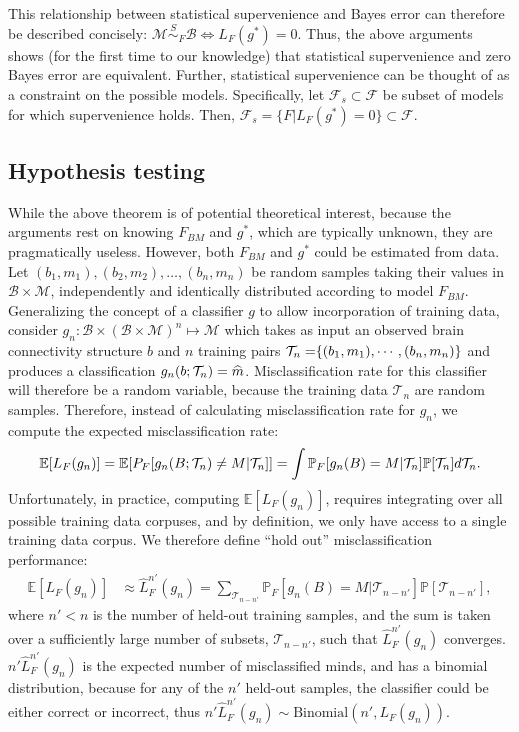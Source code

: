 \documentclass{article}
\newcommand{\mB}{\mathcal{B}}
\newcommand{\mM}{\mathcal{M}}
\newcommand{\PP}{\mathbb{P}}           %
\newcommand{\EE}{\mathbb{E}}           %
\providecommand{\mc}[1]{\mathcal{#1}}
\providecommand{\mh}[1]{\widehat{#1}}
\newcommand{\hL}{\widehat{L}}
\newcommand{\MsB}{\mM \overset{S}{\sim}_F \mB}
\providecommand{\tr}[1]{\textcolor{black}{#1}}
\begin{document}
This relationship between statistical supervenience and Bayes error can therefore be described concisely: \mbox{$\MsB \Leftrightarrow L_F(g^*)=0$}.  Thus, the above arguments shows (for the first time to our knowledge) that statistical supervenience and zero Bayes error are equivalent. Further, statistical supervenience can be thought of as a constraint on the possible models.  Specifically, let $\mc{F}_s \subset \mc{F}$ be subset of models for which supervenience holds.  Then, $\mc{F}_s = \{F | L_F(g^*)=0\} \subset \mc{F}$.


\subsection{Hypothesis testing} %
\label{sub:hypothesis_testing}

While the above theorem is of potential theoretical interest, because the arguments rest on knowing $F_{BM}$ and $g^*$, which are typically unknown, they are pragmatically useless.  However, both $F_{BM}$ and $g^*$ could be estimated from data.  Let $(b_1,m_1), (b_2,m_2), \ldots, (b_n,m_n)$ be random samples taking their values in $\mB \times \mM$, independently and identically distributed according to model $F_{BM}$.  Generalizing the concept of a classifier $g$ to allow incorporation of training data, consider $g_n:\mB \times (\mB \times \mM)^n \mapsto \mM$ which takes as input an observed brain connectivity structure $b$ and $n$ training pairs $\tr{\mc{T}_n=}\{(b_1,m_1),\cdots,(b_n,m_n)\}$ and produces a classification $g_n(b;\tr{\mc{T}_n})=\mh{m}$.  Misclassification rate for this classifier will therefore be a random variable, because the training data $\mc{T}_n$ are random samples.  Therefore, instead of calculating misclassification rate for $g_n$, we compute the expected misclassification rate: %
\begin{align}
\EE[L_{F}(g_n)] = \EE[P_{F}[g_n(B;\tr{\mc{T}_n}) \neq M|\tr{\mc{T}_n}]] = \int \PP_F[g_n(B)=M | \mc{T}_n] \PP[\mc{T}_n] d\mc{T}_n.
\end{align}
Unfortunately, in practice, computing $\EE[L_F(g_n)]$, requires integrating over all possible training data corpuses, and by definition, we only have access to a single training data corpus.  We therefore define ``hold out'' misclassification performance:
\begin{align}
\EE[L_F(g_n)] %
&\approx  \hL^{n'}_{F}(g_n) = \sum_{\mc{T}_{n-n'}} \PP_F[g_n(B)=M | \mc{T}_{n-n'}] \PP[\mc{T}_{n-n'}],
\end{align}
where $n'<n$ is the number of held-out training samples, and the sum is taken over a sufficiently large number of subsets, $\mc{T}_{n-n'}$, such that $\hL^{n'}_F(g_n)$ converges.   $n' \hL^{n'}_{F}(g_n)$ is the expected number of misclassified minds, and has a binomial distribution, because for any of the $n'$ held-out samples, the classifier could be either correct or incorrect, thus $n' \hL^{n'}_{F}(g_n) \sim \text{Binomial}(n',L_{F}(g_n))$.
\end{document}
